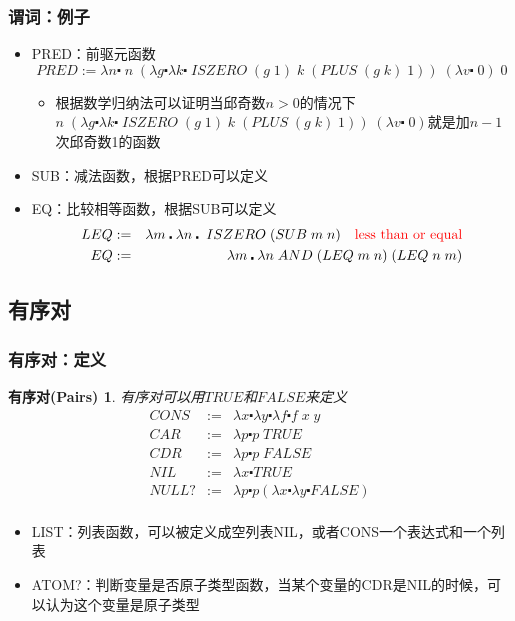 \documentclass[CJKutf8,compress,hyperref]{beamer}
\begin{document}
\begin{CJK}{UTF8}{song}
\begin{frame}
  \frametitle{谓词：例子} 
  \begin{itemize}
  \item PRED：前驱元函数
    \begin{displaymath}
      PRED := \lambda n \centerdot \; n \; (\lambda g \centerdot \lambda k \centerdot \; ISZERO \; (g \; 1) \; k \; (PLUS \; (g \; k) \; 1)) \; (\lambda v \centerdot \; 0) \; 0
    \end{displaymath} 
    \begin{itemize}
    \item 根据数学归纳法可以证明当邱奇数$n > 0$的情况下$n \; (\lambda g \centerdot \lambda k \centerdot \; ISZERO \; (g \; 1) \; k \; (PLUS \; (g \; k) \; 1)) \; (\lambda v \centerdot \; 0)$就是加$n-1$次邱奇数1的函数
    \end{itemize} 
  \item SUB：减法函数，根据PRED可以定义 
  \item EQ：比较相等函数，根据SUB可以定义
    \begin{eqnarray*}
      LEQ & :=  & \lambda m \centerdot \lambda n \centerdot \; ISZERO \; (SUB\;m\;n) \quad {\color{red}\textrm{less than or equal}} \\ 
      EQ & := & \lambda m \centerdot \lambda n \; AND \; (LEQ \; m \; n) \; (LEQ \; n \; m) 
    \end{eqnarray*}
  \end{itemize}
\end{frame}

\subsection{有序对}
\begin{frame}
  \frametitle{有序对：定义} 
  \newtheorem{pairs}{有序对(Pairs)}
  \begin{pairs}
    有序对可以用$TRUE$和$FALSE$来定义　
    \begin{eqnarray*}
      CONS & := & \lambda x \centerdot \lambda y \centerdot \lambda f \centerdot f \; x \; y \\ 
      CAR & := & \lambda p \centerdot p \; TRUE \\
      CDR & := & \lambda p \centerdot p \; FALSE \\ 
      NIL & := & \lambda x \centerdot TRUE \\
      NULL? & := & \lambda p \centerdot p(\lambda x \centerdot \lambda y \centerdot FALSE) \\
    \end{eqnarray*} 
  \end{pairs}
  \begin{itemize}
  \item LIST：列表函数，可以被定义成空列表NIL，或者CONS一个表达式和一个列表 
  \item ATOM?：判断变量是否原子类型函数，当某个变量的CDR是NIL的时候，可以认为这个变量是原子类型 
  \end{itemize}
\end{frame}


\end{CJK}
\end{document}
